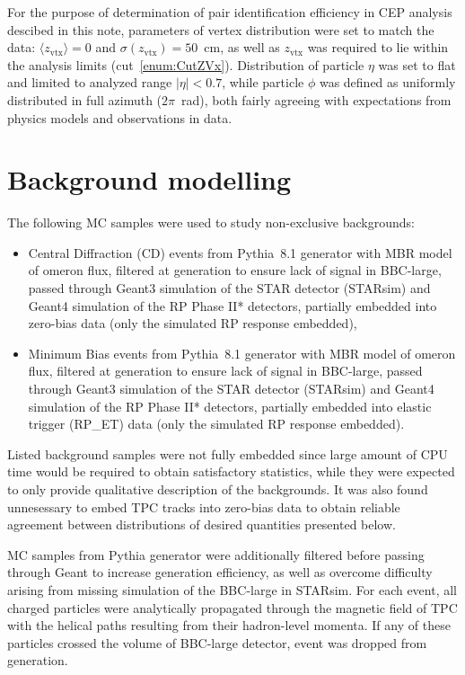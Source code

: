 For the purpose of determination of pair identification efficiency in CEP analysis descibed in this note, parameters of vertex distribution were set to match the data: $\langle z_{\text{vtx}}\rangle=0$ and $\sigma(z_{\text{vtx}})=50$~cm, as well as $z_{\text{vtx}}$ was required to lie within the analysis limits (cut~\ref{enum:CutZVx}). Distribution of particle $\eta$ was set to flat and limited to analyzed range $|\eta|<0.7$, while particle $\phi$ was defined as uniformly distributed in full azimuth ($2\pi$~rad), both fairly agreeing with expectations from physics models and observations in data.

\section{Background modelling}\label{sec:mcBkgdContrib}

The following MC samples were used to study non-exclusive backgrounds:
\begin{itemize}
 \item Central Diffraction (CD) events from Pythia~8.1 generator with MBR model of \Pom omeron flux, filtered at generation to ensure lack of signal in BBC-large, passed through Geant3 simulation of the STAR detector (STARsim) and Geant4 simulation of the RP Phase II* detectors, partially embedded into zero-bias data (only the simulated RP response embedded),%
 \item Minimum Bias events from Pythia~8.1 generator with MBR model of \Pom omeron flux, filtered at generation to ensure lack of signal in BBC-large, passed through Geant3 simulation of the STAR detector (STARsim) and Geant4 simulation of the RP Phase II* detectors, partially embedded into elastic trigger (RP\_ET) data (only the simulated RP response embedded).%
\end{itemize}

Listed background samples were not fully embedded since large amount of CPU time would be required to obtain satisfactory statistics, while they were expected to only provide qualitative description of the backgrounds. It was also found unnesessary to embed TPC tracks into zero-bias data to obtain reliable agreement between distributions of desired quantities presented below.

MC samples from Pythia generator were additionally filtered before passing through Geant to increase generation efficiency, as well as overcome difficulty arising from missing simulation of the BBC-large in STARsim. For each event, all charged particles were analytically propagated through the magnetic field of TPC with the helical paths resulting from their hadron-level momenta. If any of these particles crossed the volume of BBC-large detector, event was dropped from generation.


